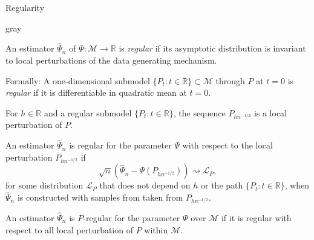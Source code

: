 \documentclass[smaller]{beamer}\usepackage{listings}
\newcommand{\R}{\mathbb{R}}
\newcommand{\1}{\mathds{1}}
\begin{document}
\begin{frame}[label={sec:org64fb1f6}]{Regularity}
\begin{beamercolorbox}[rounded=true]{gray}

\centering An estimator \( \hat{\Psi}_n \) of
$\Psi \colon \mathcal{M} \rightarrow \R$ is \textit{regular} if its asymptotic
distribution is invariant to local perturbations of the data generating
mechanism.
\end{beamercolorbox}

\begin{block}{}
\small



Formally: A one-dimensional submodel \( \{P_t : t \in \R\} \subset \mathcal{M} \)
through \( P \) at \( t=0 \) is \textit{regular} if it is differentiable in
quadratic mean at \( t=0 \).

\hfill

For \( h \in \R \) and a regular submodel \( \{P_t : t \in \R\} \), the
sequence \( P_{h n^{-1/2}} \) is a local perturbation of \( P \).

\hfill

An estimator $\hat{\Psi}_n$ is regular for the parameter $\Psi$ with respect
to the local perturbation \( P_{h n^{-1/2}} \) if
\begin{equation*}
  \sqrt{n}(\hat{\Psi}_n - \Psi(P_{h n^{-1/2}})) \rightsquigarrow \mathcal{L}_P,
\end{equation*}
for some distribution \( \mathcal{L}_P \) that does not depend on \( h \) or
the path \( \{P_t : t \in \R\} \), when \( \hat{\Psi}_n \) is constructed with
samples from taken from \( P_{h n^{-1/2}} \).

\hfill

An estimator $\hat{\Psi}_n$ is \( P \)-regular for the parameter $\Psi$ over
\( \mathcal{M} \) if it is regular with respect to all local perturbation of
\( P \) within \( \mathcal{M} \).
\end{block}
\end{frame}
\end{document}
